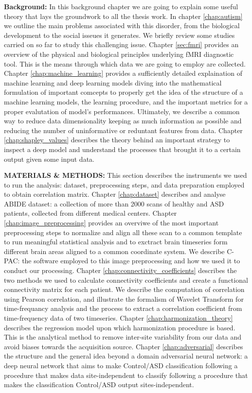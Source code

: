 \documentclass[10pt]{report}
\begin{document}
\textbf{Background:} In this background chapter we are going to explain some useful theory that lays the groundwork to all the thesis work.
In chapter \ref{chap:autism} we outline the main problems associated with this disorder, from the biological development to the social isseues it generates. We briefly review some studies carried on so far to study this challenging issue.
Chapter \ref{sec:fmri} provides an overview of the physical and biological principles underlying fMRI diagnostic tool. This is the means through which data we are going to employ are collected.
Chapter \ref{chap:machine_learning} provides a sufficiently detailed explaination of machine learning and deep learning models diving into the mathematical formulation of important comcepts to properly get the idea of the structure of a machine learning models, the learning procedure, and the important metrics for a proper evalutation of model's performances. Ultimately, we describe a common way to reduce data dimensionality keeping as much information as possible and reducing the number of uninformative or reduntant features from data.
Chapter \ref{chap:shapley_values} describes the theory behind an important strategy to inspect a deep model and understand the processes that brought it to a certain output given some input data.

\textbf{MATERIALS \& METHODS:} This section describes the instruments we used to run the analysis: dataset, preprocessing steps, and data preparation employed to obtain correlation matrix.
Chapter \ref{chap:dataset} describes and analyse ABIDE dataset: a collection of more than 2000 scans of healthy and ASD patients, collected from different medical centers.
Chapter \ref{chap:image_preprocessing} provides an overviwe of the most important preprocessing steps to normalize and align all these scan to a common template to run meaningful statistical analysis and to exctract brain timeseries form different brain areas aligned to a common coordinate system. We describe C-PAC: the software employed to this image preprocessing and how we used it to conduct our processing.
Chapter \ref{chap:connectivity_coefficients} describes the two methods we used to calculate connectivity coefficients and create a functional connectivity matrix for each patient. We describe the computation of correlation using Pearson correlation, and illustrate the formalism of Wavelet Transform for time-frequancy analysis and the process to extract a correlation coefficient from time-frequency data of two timeseries.
Chapter \ref{chap:harmonization_theory} describes the regression model upon which harmonization procedure is based. This is the analytical method to remove inter-site variability from our data and avoid biases towards the acquisition source.
Chapter \ref{chap:adversarial} describes the structure and the general idea beyond a domain adversarial neural network: a deep neural network that aims
to make Control/ASD classification following a procedure that makes data site-independent to classify following a procedure that makes the classification Control/ASD output sites-independent.
\end{document}
